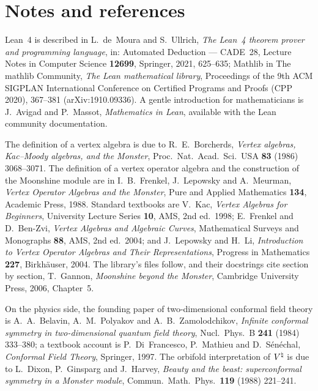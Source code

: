 \section{Notes and references}\label{ch01:sec:notes}

Lean~4 is described in L.~de~Moura and S.~Ullrich, \emph{The Lean~4 theorem prover and programming
language}, in: Automated Deduction --- CADE~28, Lecture Notes in Computer Science \textbf{12699},
Springer, 2021, 625--635; Mathlib in The mathlib Community, \emph{The Lean mathematical library},
Proceedings of the 9th ACM SIGPLAN International Conference on Certified Programs and Proofs (CPP
2020), 367--381 (arXiv:1910.09336). A gentle introduction for mathematicians is J.~Avigad and
P.~Massot, \emph{Mathematics in Lean}, available with the Lean community documentation.

The definition of a vertex algebra is due to R.~E.~Borcherds, \emph{Vertex algebras, Kac--Moody
algebras, and the Monster}, Proc.\ Nat.\ Acad.\ Sci.\ USA \textbf{83} (1986) 3068--3071. The
definition of a vertex operator algebra and the construction of the Moonshine module are in
I.~B.~Frenkel, J.~Lepowsky and A.~Meurman, \emph{Vertex Operator Algebras and the Monster}, Pure and
Applied Mathematics \textbf{134}, Academic Press, 1988. Standard textbooks are V.~Kac, \emph{Vertex
Algebras for Beginners}, University Lecture Series \textbf{10}, AMS, 2nd ed.\ 1998; E.~Frenkel and
D.~Ben-Zvi, \emph{Vertex Algebras and Algebraic Curves}, Mathematical Surveys and Monographs
\textbf{88}, AMS, 2nd ed.\ 2004; and J.~Lepowsky and H.~Li, \emph{Introduction to Vertex Operator
Algebras and Their Representations}, Progress in Mathematics \textbf{227}, Birkh\"auser, 2004. The
library's files follow, and their docstrings cite section by section, T.~Gannon, \emph{Moonshine
beyond the Monster}, Cambridge University Press, 2006, Chapter~5.

On the physics side, the founding paper of two-dimensional conformal field theory is A.~A.~Belavin,
A.~M.~Polyakov and A.~B.~Zamolodchikov, \emph{Infinite conformal symmetry in two-dimensional quantum
field theory}, Nucl.\ Phys.\ B \textbf{241} (1984) 333--380; a textbook account is P.~Di~Francesco,
P.~Mathieu and D.~S\'en\'echal, \emph{Conformal Field Theory}, Springer, 1997. The orbifold
interpretation of ${V^{\natural}}$ is due to L.~Dixon, P.~Ginsparg and J.~Harvey, \emph{Beauty and the beast:
superconformal symmetry in a Monster module}, Commun.\ Math.\ Phys.\ \textbf{119} (1988) 221--241.


